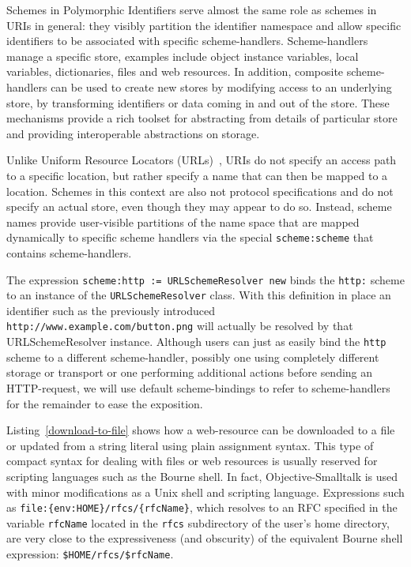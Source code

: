 \documentclass[preprint]{sigplanconf}
\begin{document}
Schemes in Polymorphic Identifiers serve almost the same role as schemes in URIs
in general:  they visibly partition the identifier namespace and allow specific identifiers
to be associated with specific scheme-handlers.  Scheme-handlers manage a specific
store, examples include object instance variables, local variables, dictionaries, files
and web resources.  In addition, composite scheme-handlers can be used to 
create new stores by modifying access to an underlying store, by transforming 
identifiers or data coming in and out of the store.  These mechanisms provide
a rich toolset for abstracting from details of particular store and providing interoperable
abstractions on storage.

Unlike Uniform Resource Locators (URLs)~\cite{rfc1738}, URIs do not specify an access
path to a specific location, but rather specify a name that can then be mapped to a location.
Schemes in this context are also not protocol specifications and do not specify an actual store,
even though they may appear to do so.  Instead, scheme names provide user-visible
partitions of the name space that are mapped dynamically to specific scheme handlers
via the special {\tt scheme:scheme} that contains scheme-handlers.

The expression {\tt scheme:http := URLSchemeResolver new}
binds the {\tt http:} scheme to an instance of the {\tt URLSchemeResolver} class. With this
definition in place an identifier such as the previously introduced {\tt http://www.example.com/button.png} will actually be
resolved by that URLSchemeResolver instance.  Although users can just as easily bind 
the {\tt http} scheme to a different scheme-handler, possibly one using completely different
storage or transport or one performing additional actions before sending an HTTP-request,
we will use default scheme-bindings to refer to scheme-handlers for the remainder 
to ease the exposition.


Listing~\ref{download-to-file} shows how a web-resource can be downloaded to a file
or updated from a string literal using plain assignment syntax.  This type of compact
syntax for dealing with files or web resources is usually reserved for scripting languages 
such as the Bourne shell.  In fact, Objective-Smalltalk is used with minor modifications as a
Unix shell and scripting language. Expressions such as {\tt file:\{env:HOME\}/rfcs/\{rfcName\}},
which resolves to an RFC specified in the variable {\tt rfcName} located in the {\tt rfcs}
subdirectory of the user's home directory, are very close to the expressiveness (and obscurity)
of the equivalent Bourne shell expression: {\tt \$HOME/rfcs/\$rfcName}.
\end{document}
